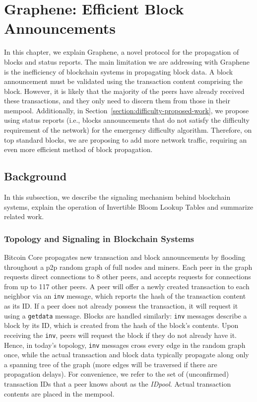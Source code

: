 \chapter{Graphene: Efficient Block Announcements}
\label{graphene}

In this chapter, we explain Graphene, a novel protocol for the propagation of blocks and status reports. The main limitation we are addressing with Graphene is the inefficiency of blockchain systems in propagating block data.  A block announcement must be validated using  the transaction content comprising the block.  However, it is likely that the majority of the peers have already received these transactions, and they only need to discern them from those in their mempool. Additionally, in Section~\ref{section:difficulty-proposed-work}, we propose using status reports (i.e., blocks announcements that do not satisfy the difficulty requirement of the network) for the emergency difficulty algorithm. Therefore, on top standard blocks, we are proposing to add more network traffic, requiring an even more efficient method of block propagation.

\section{Background}
In this subsection, we describe the signaling mechanism behind blockchain systems, explain the operation of Invertible Bloom Lookup Tables and summarize related work.

\subsection{Topology and Signaling in Blockchain Systems} 
Bitcoin Core propagates new transaction and
block announcements by flooding throughout a p2p random graph of full
nodes and miners. Each peer in the graph requests direct connections
to 8 other peers, and accepts requests for connections from up to 117
other peers. A peer will offer a newly created transaction to each
neighbor via an {\tt inv} message, which reports the hash of the
transaction content as its ID. If a peer does not already possess the
transaction, it will request it using a {\tt getdata} message. Blocks
are handled similarly: {\tt inv} messages describe a block by its ID, which
is created from the hash of the block's contents.  Upon receiving the
{\tt inv}, peers will request the block if they do not already have it.
Hence, in today's topology, {\tt inv} messages cross every edge in the
random graph once, while the actual transaction and block data
typically propagate along only a spanning tree of the graph (more
edges will be traversed if there are propagation delays).  For
convenience, we refer to the set of (unconfirmed)
transaction IDs that a peer knows about as the {\em IDpool}. Actual
transaction contents are placed in the mempool.


